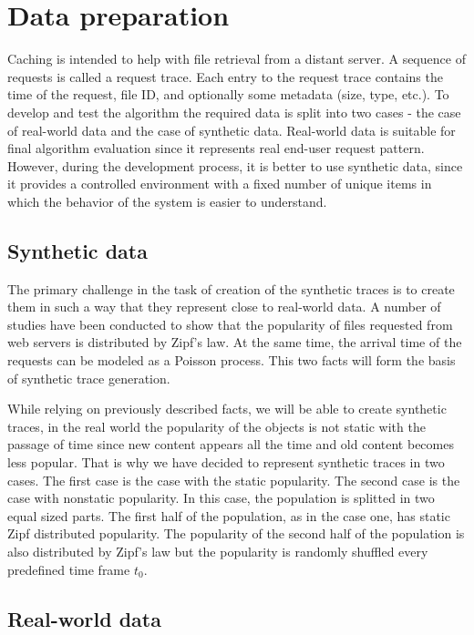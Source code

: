\section{Data preparation}

Caching is intended to help with file retrieval from a distant server. A sequence of requests is called a request trace. Each entry to the request trace contains the time of the request, file ID, and optionally some metadata (size, type, etc.). To develop and test the algorithm the required data is split into two cases - the case of real-world data and the case of synthetic data. Real-world data is suitable for final algorithm evaluation since it represents real end-user request pattern. However, during the development process, it is better to use synthetic data, since it provides a controlled environment with a fixed number of unique items in which the behavior of the system is easier to understand.

\subsection{Synthetic data}

The primary challenge in the task of creation of the synthetic traces is to create them in such a way that they represent close to real-world data. A number of studies have been conducted to show that the popularity of files requested from web servers is distributed by Zipf's law\cite{10}. At the same time, the arrival time of the requests can be modeled as a Poisson process\cite{11}. This two facts will form the basis of synthetic trace generation.

While relying on previously described facts, we will be able to create synthetic traces, in the real world the popularity of the objects is not static with the passage of time since new content appears all the time and old content becomes less popular. That is why we have decided to represent synthetic traces in two cases. The first case is the case with the static popularity. The second case is the case with nonstatic popularity. In this case, the population is splitted in two equal sized parts. The first half of the population, as in the case one, has static Zipf distributed popularity. The popularity of the second half of the population is also distributed by Zipf's law but the popularity is randomly shuffled every predefined time frame $ t_0 $.

\subsection{Real-world data}

